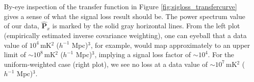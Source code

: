 \documentclass[preprint2,numberedappendix,tighten]{aastex6}
\newcommand{\phat}{\widehat{\mathbf{p}}}
\begin{document}

By-eye inspection of the transfer function in Figure \ref{fig:sigloss_transfercurve} gives a sense of what the signal loss result should be. The power spectrum value of our data, $
\widehat{\textbf{P}}_{x}$ is marked by the solid gray horizontal lines. From the left plot (empirically estimated inverse covariance weighting), one can eyeball that a data value of $10^{4} \,$mK$^{2}$ ($h^{-1}$ Mpc)$^{3}$, for example, would map approximately to an upper limit of $\sim10^{8} \,$mK$^{2}$ ($h^{-1}$ Mpc)$^{3}$, implying a signal loss factor of $\sim10^{4}$. For the uniform-weighted case (right plot), we see no loss at a data value of $\sim10^{7} \,$mK$^{2}$ ($h^{-1}$ Mpc)$^{3}$.
\end{document}
